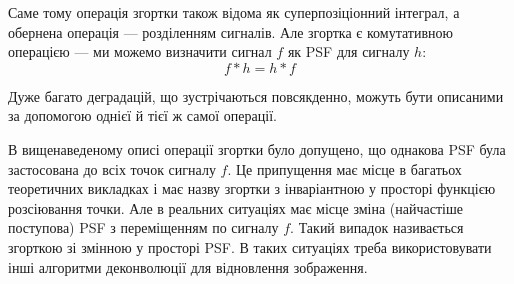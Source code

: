 \documentclass{diploma}
\begin{document}
      Саме тому операція згортки також відома як суперпозіціонний інтеграл, а
      обернена операція --- розділенням сигналів.
      Але згортка є комутативною операцією --- ми можемо визначити сигнал $f$
      як PSF для сигналу $h$:
      \[ f * h = h * f \]

      Дуже багато деградацій, що зустрічаються повсякденно, можуть бути
      описаними за допомогою однієї й тієї ж самої операції.

      В вищенаведеному описі операції згортки було допущено, що однакова PSF
      була застосована до всіх точок сигналу $f$.
      Це припущення має місце в багатьох теоретичних викладках і має назву
      згортки з інваріантною у просторі функцією розсіювання точки.
      Але в реальних ситуаціях має місце зміна (найчастіше поступова) PSF з
      переміщенням по сигналу $f$.
      Такий випадок називається згорткою зі змінною у просторі PSF.
      В таких ситуаціях треба використовувати інші алгоритми деконволюції для
      відновлення зображення.\cite{book2}
\end{document}
